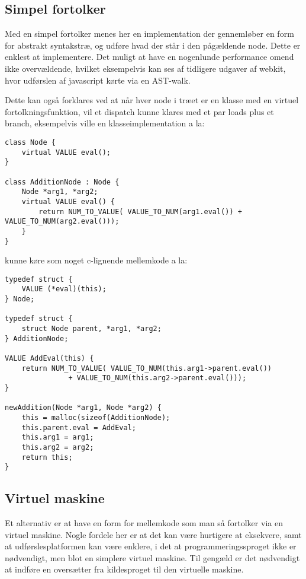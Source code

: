 \subsection{Simpel fortolker}
Med en simpel fortolker menes her en implementation der gennemløber en form for abstrakt syntakstræ, og udføre hvad der står i den pågældende node. 
Dette er enklest at implementere.
Det muligt at have en nogenlunde performance omend ikke overvældende, hvilket eksempelvis kan ses af tidligere udgaver af webkit, hvor udførslen af javascript kørte via en AST-walk. 

Dette kan også forklares ved at når hver node i træet er en klasse med en virtuel fortolkningsfunktion, vil et dispatch kunne klares med et par loads plus et branch, eksempelvis ville en klasseimplementation a la:
\begin{verbatim}
class Node {
    virtual VALUE eval();
}

class AdditionNode : Node {
    Node *arg1, *arg2;
    virtual VALUE eval() {
        return NUM_TO_VALUE( VALUE_TO_NUM(arg1.eval()) + VALUE_TO_NUM(arg2.eval()));
    }
}
\end{verbatim}
kunne køre som noget c-lignende mellemkode a la:
\begin{verbatim}
typedef struct {
    VALUE (*eval)(this);
} Node;

typedef struct {
    struct Node parent, *arg1, *arg2;
} AdditionNode;

VALUE AddEval(this) {
    return NUM_TO_VALUE( VALUE_TO_NUM(this.arg1->parent.eval()) 
               + VALUE_TO_NUM(this.arg2->parent.eval()));
}

newAddition(Node *arg1, Node *arg2) {
    this = malloc(sizeof(AdditionNode);
    this.parent.eval = AddEval;
    this.arg1 = arg1;
    this.arg2 = arg2;
    return this;
}
\end{verbatim}

\subsection{Virtuel maskine}

Et alternativ er at have en form for mellemkode som man så fortolker via en virtuel maskine. Nogle fordele her er at det kan være hurtigere at eksekvere, samt at udførslesplatformen kan være enklere, i det at programmeringssproget ikke er nødvendigt, men blot en simplere virtuel maskine. Til gengæld er det nødvendigt at indføre en oversætter fra kildesproget til den virtuelle maskine.

